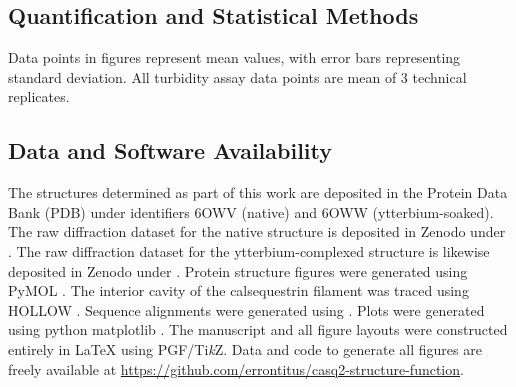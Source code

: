 \subsection*{Quantification and Statistical Methods}
Data points in figures represent mean values, with error bars representing standard deviation. All turbidity assay data points are mean of 3 technical replicates.

\subsection*{Data and Software Availability}
The structures determined as part of this work are deposited in the Protein Data Bank (PDB) under identifiers 6OWV (native) and 6OWW (ytterbium-soaked). The raw diffraction dataset for the native structure is deposited in Zenodo under . The raw diffraction dataset for the ytterbium-complexed structure is likewise deposited in Zenodo under . Protein structure figures were generated using PyMOL \cite{PyMOL}. The interior cavity of the calsequestrin filament was traced using HOLLOW \cite{Ho2008-og}. Sequence alignments were generated using \TeXshade \cite{Beitz2000-lf}. Plots were generated using python matplotlib \cite{Hunter:2007}. The manuscript and all figure layouts were constructed entirely in \LaTeX{} using PGF/Ti\textit{k}Z. Data and code to generate all figures are freely available at \url{https://github.com/errontitus/casq2-structure-function}.
